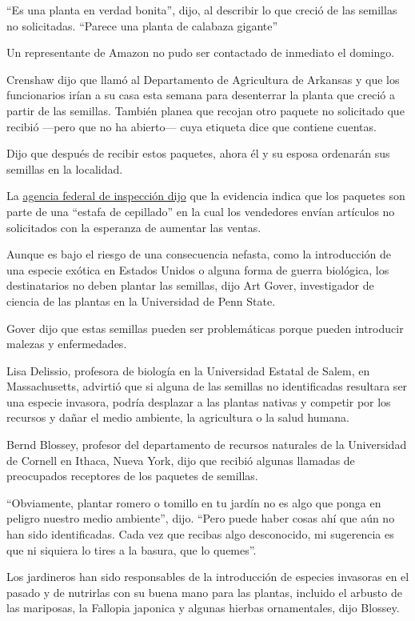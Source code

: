 ``Es una planta en verdad bonita'', dijo, al describir lo que creció de
las semillas no solicitadas. ``Parece una planta de calabaza gigante''

Un representante de Amazon no pudo ser contactado de inmediato el
domingo.

Crenshaw dijo que llamó al Departamento de Agricultura de Arkansas y que
los funcionarios irían a su casa esta semana para desenterrar la planta
que creció a partir de las semillas. También planea que recojan otro
paquete no solicitado que recibió ---pero que no ha abierto--- cuya
etiqueta dice que contiene cuentas.

Dijo que después de recibir estos paquetes, ahora él y su esposa
ordenarán sus semillas en la localidad.

La
\href{https://www.aphis.usda.gov/aphis/newsroom/stakeholder-info/sa_by_date/sa-2020/sa-07/seeds-china}{agencia
federal de inspección dijo} que la evidencia indica que los paquetes son
parte de una ``estafa de cepillado'' en la cual los vendedores envían
artículos no solicitados con la esperanza de aumentar las ventas.

Aunque es bajo el riesgo de una consecuencia nefasta, como la
introducción de una especie exótica en Estados Unidos o alguna forma de
guerra biológica, los destinatarios no deben plantar las semillas, dijo
Art Gover, investigador de ciencia de las plantas en la Universidad de
Penn State.

Gover dijo que estas semillas pueden ser problemáticas porque pueden
introducir malezas y enfermedades.

Lisa Delissio, profesora de biología en la Universidad Estatal de Salem,
en Massachusetts, advirtió que si alguna de las semillas no
identificadas resultara ser una especie invasora, podría desplazar a las
plantas nativas y competir por los recursos y dañar el medio ambiente,
la agricultura o la salud humana.

Bernd Blossey, profesor del departamento de recursos naturales de la
Universidad de Cornell en Ithaca, Nueva York, dijo que recibió algunas
llamadas de preocupados receptores de los paquetes de semillas.

``Obviamente, plantar romero o tomillo en tu jardín no es algo que ponga
en peligro nuestro medio ambiente'', dijo. ``Pero puede haber cosas ahí
que aún no han sido identificadas. Cada vez que recibas algo
desconocido, mi sugerencia es que ni siquiera lo tires a la basura, que
lo quemes''.

Los jardineros han sido responsables de la introducción de especies
invasoras en el pasado y de nutrirlas con su buena mano para las
plantas, incluido el arbusto de las mariposas, la Fallopia japonica y
algunas hierbas ornamentales, dijo Blossey.

